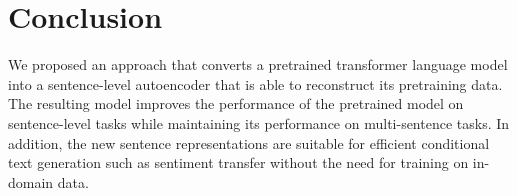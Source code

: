 \section{Conclusion}
We proposed an approach that converts a pretrained transformer language model into a  
sentence-level autoencoder that is able to reconstruct its pretraining data. The resulting model improves the performance of the pretrained model on sentence-level tasks while maintaining its performance on multi-sentence tasks. In addition, the new sentence representations are suitable for efficient conditional text generation such as sentiment transfer without the need for training on in-domain data. 



